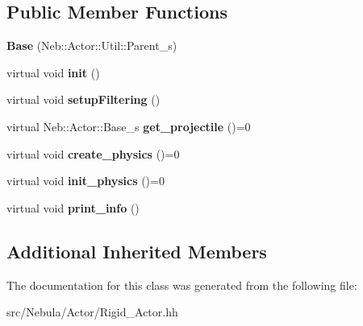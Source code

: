 \subsection*{Public Member Functions}
\begin{DoxyCompactItemize}
\item 
\hypertarget{classNeb_1_1Actor_1_1RigidActor_1_1Base_aa0ba49934f963f62868f795bf30d0094}{{\bfseries Base} (Neb\-::\-Actor\-::\-Util\-::\-Parent\-\_\-s)}\label{classNeb_1_1Actor_1_1RigidActor_1_1Base_aa0ba49934f963f62868f795bf30d0094}

\item 
\hypertarget{classNeb_1_1Actor_1_1RigidActor_1_1Base_adfc7548935638be63ba00048be867acb}{virtual void {\bfseries init} ()}\label{classNeb_1_1Actor_1_1RigidActor_1_1Base_adfc7548935638be63ba00048be867acb}

\item 
\hypertarget{classNeb_1_1Actor_1_1RigidActor_1_1Base_aa4b911619bfe07d168409f7f17c361d8}{virtual void {\bfseries setup\-Filtering} ()}\label{classNeb_1_1Actor_1_1RigidActor_1_1Base_aa4b911619bfe07d168409f7f17c361d8}

\item 
\hypertarget{classNeb_1_1Actor_1_1RigidActor_1_1Base_a7fe627181ce217ec0dfd5eb23b410c49}{virtual Neb\-::\-Actor\-::\-Base\-\_\-s {\bfseries get\-\_\-projectile} ()=0}\label{classNeb_1_1Actor_1_1RigidActor_1_1Base_a7fe627181ce217ec0dfd5eb23b410c49}

\item 
\hypertarget{classNeb_1_1Actor_1_1RigidActor_1_1Base_ac7662178d8468d3d80fe1074f3e03277}{virtual void {\bfseries create\-\_\-physics} ()=0}\label{classNeb_1_1Actor_1_1RigidActor_1_1Base_ac7662178d8468d3d80fe1074f3e03277}

\item 
\hypertarget{classNeb_1_1Actor_1_1RigidActor_1_1Base_aff211aa28ad50ac3f141bfbde642d738}{virtual void {\bfseries init\-\_\-physics} ()=0}\label{classNeb_1_1Actor_1_1RigidActor_1_1Base_aff211aa28ad50ac3f141bfbde642d738}

\item 
\hypertarget{classNeb_1_1Actor_1_1RigidActor_1_1Base_a6a6a3efeba23a8bd9a20e888bc44a4ce}{virtual void {\bfseries print\-\_\-info} ()}\label{classNeb_1_1Actor_1_1RigidActor_1_1Base_a6a6a3efeba23a8bd9a20e888bc44a4ce}

\end{DoxyCompactItemize}
\subsection*{Additional Inherited Members}


The documentation for this class was generated from the following file\-:\begin{DoxyCompactItemize}
\item 
src/\-Nebula/\-Actor/Rigid\-\_\-\-Actor.\-hh\end{DoxyCompactItemize}
